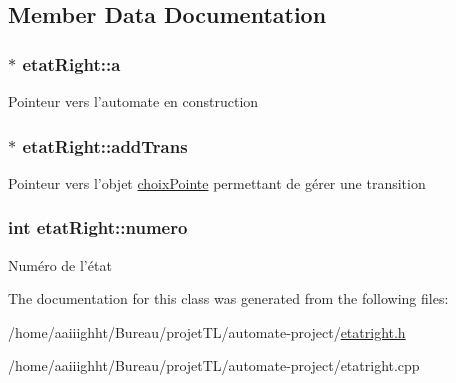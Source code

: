 \subsection{Member Data Documentation}
\hypertarget{classetat_right_aa6d344e0bd745915bfb4ea0e767f0bc0}{
\subsubsection[{a}]{$\ast$ etat\-Right\-::a}}\label{classetat_right_aa6d344e0bd745915bfb4ea0e767f0bc0}
Pointeur vers l'automate en construction \hypertarget{classetat_right_a1a3bbd118e907a6b9fe76ac22c702006}{
\subsubsection[{add\-Trans}]{$\ast$ etat\-Right\-::add\-Trans}}\label{classetat_right_a1a3bbd118e907a6b9fe76ac22c702006}
Pointeur vers l'objet \hyperlink{classchoix_pointe}{choix\-Pointe} permettant de gérer une transition \hypertarget{classetat_right_ab061da0425585fa691f3766e3e81708c}{
\subsubsection[{numero}]{\setlength{\rightskip}{0pt plus 5cm}int etat\-Right\-::numero}}\label{classetat_right_ab061da0425585fa691f3766e3e81708c}
Numéro de l'état 

The documentation for this class was generated from the following files\-:\begin{DoxyCompactItemize}
\item 
/home/aaiiighht/\-Bureau/projet\-T\-L/automate-\/project/\hyperlink{etatright_8h}{etatright.\-h}\item 
/home/aaiiighht/\-Bureau/projet\-T\-L/automate-\/project/etatright.\-cpp\end{DoxyCompactItemize}
